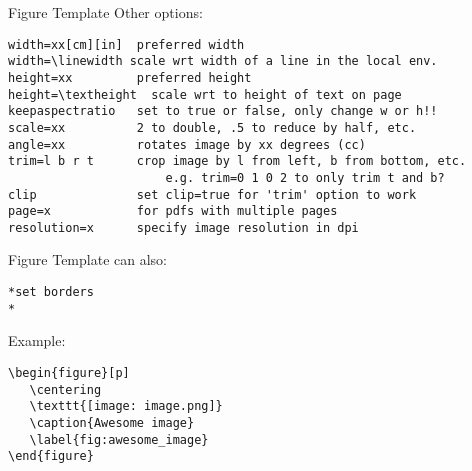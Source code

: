 \documentclass[9pt]{beamer}
\begin{document}
\begin{frame}[fragile=singleslide]{Figure Template}
Other options:
    \begin{verbatim}
width=xx[cm][in]  preferred width
width=\linewidth scale wrt width of a line in the local env.
height=xx         preferred height
height=\textheight  scale wrt to height of text on page
keepaspectratio   set to true or false, only change w or h!!
scale=xx          2 to double, .5 to reduce by half, etc.
angle=xx          rotates image by xx degrees (cc)
trim=l b r t      crop image by l from left, b from bottom, etc.
                      e.g. trim=0 1 0 2 to only trim t and b?
clip              set clip=true for 'trim' option to work
page=x            for pdfs with multiple pages
resolution=x      specify image resolution in dpi
    \end{verbatim}
\end{frame}%
\begin{frame}[fragile=singleslide]{Figure Template}
    can also:
    \begin{verbatim}
*set borders
*
    \end{verbatim}
    Example:
    \begin{verbatim}
\begin{figure}[p]
   \centering
   \texttt{[image: image.png]}
   \caption{Awesome image}
   \label{fig:awesome_image}
\end{figure}
    \end{verbatim}
\end{frame}%
\end{document}
